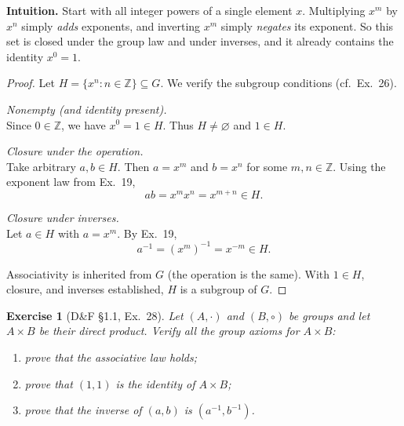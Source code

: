\documentclass[12pt]{article}
\newtheorem{exercise}[theorem]{Exercise}
\theoremstyle{definition}
\begin{document}
\dotfill

\noindent
\textbf{Intuition.}
Start with all integer powers of a single element $x$. Multiplying $x^m$ by $x^n$ simply \emph{adds} exponents,
and inverting $x^m$ simply \emph{negates} its exponent. So this set is closed under the group law and under inverses,
and it already contains the identity $x^0=1$.

\dotfill

\begin{proof}
Let $H=\{x^n:n\in\mathbb{Z}\}\subseteq G$. We verify the subgroup conditions (cf.\ Ex.~26).

\dotfill

\noindent\emph{Nonempty (and identity present).}\\

\noindent
Since $0\in\mathbb{Z}$, we have $x^0=1\in H$. Thus $H\neq\varnothing$ and $1\in H$.

\dotfill

\noindent\emph{Closure under the operation.}\\

\noindent
Take arbitrary $a,b\in H$. Then $a=x^m$ and $b=x^n$ for some $m,n\in\mathbb{Z}$. Using the exponent law
from Ex.~19,
\[
ab=x^m x^n = x^{m+n}\in H.
\]

\dotfill

\noindent\emph{Closure under inverses.}\\

\noindent
Let $a\in H$ with $a=x^m$. By Ex.~19,
\[
a^{-1}=(x^m)^{-1}=x^{-m}\in H.
\]

\dotfill

\noindent
Associativity is inherited from $G$ (the operation is the same). With $1\in H$, closure, and inverses established,
$H$ is a subgroup of $G$.
\end{proof}

\newpage

\begin{exercise}[D\&F §1.1, Ex.~28]
Let $(A,\cdot)$ and $(B,\circ)$ be groups and let $A\times B$ be their direct product.
Verify all the group axioms for $A\times B$:
\begin{enumerate}
\item[(a)] prove that the associative law holds;
\item[(b)] prove that $(1,1)$ is the identity of $A\times B$;
\item[(c)] prove that the inverse of $(a,b)$ is $(a^{-1},b^{-1})$.
\end{enumerate}
\end{exercise}
\end{document}
